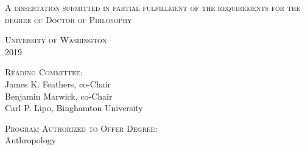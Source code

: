 

\begin{titlingpage}
\begin{center}\leavevmode

    \normalfont
    \vfill

    {\Large \textsc{\thesisTitle}\par
    \hrulefill\par}
    
    \vfill
    
    {\Large \thesisAuthor\par}%

	\vfill
    
    {\large \textsc{A dissertation
submitted in partial fulfillment of the
requirements for the degree of Doctor of Philosophy\\[0.5em]}}
    
\vfill

    
    {\large \textsc{University of Washington\\ 2019}}

	\vfill
	
	{\large \textsc{Reading Committee:}\\
	James K. Feathers, co-Chair\\
	Benjamin Marwick, co-Chair\\ 
	Carl P. Lipo, Binghamton University\\}
	
	\vfill
	
	{\large \textsc{Program Authorized to Offer Degree:}\\
	Anthropology\\}
	
	

\end{center}%
\end{titlingpage}
